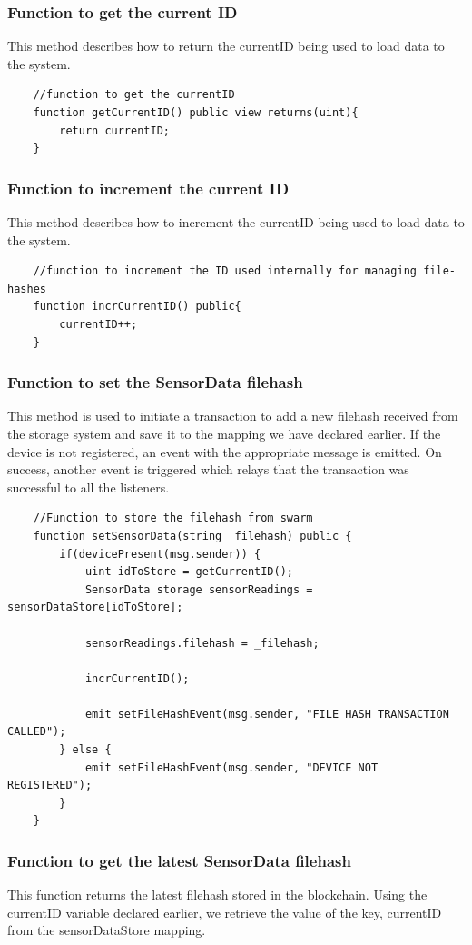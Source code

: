 \documentclass[11pt,openright]{report}
\begin{document}
\subsubsection{Function to get the current ID}
This method describes how to return the currentID being used to load data to the system.
\begin{verbatim}
    //function to get the currentID
    function getCurrentID() public view returns(uint){
        return currentID;
    }
\end{verbatim}
\subsubsection{Function to increment the current ID}
This method describes how to increment the currentID being used to load data to the system.
\begin{verbatim}
    //function to increment the ID used internally for managing file-hashes
    function incrCurrentID() public{
        currentID++;
    }
\end{verbatim}

\subsubsection{Function to set the SensorData filehash}
This method is used to initiate a transaction to add a new filehash received from the storage system and save it to the mapping we have declared earlier. If the device is not registered, an event with the appropriate message is emitted. On success, another event is triggered which relays that the transaction was successful to all the listeners.

\begin{verbatim}
    //Function to store the filehash from swarm
    function setSensorData(string _filehash) public {
        if(devicePresent(msg.sender)) {
            uint idToStore = getCurrentID();
            SensorData storage sensorReadings = sensorDataStore[idToStore];

            sensorReadings.filehash = _filehash;
       
            incrCurrentID();
            
            emit setFileHashEvent(msg.sender, "FILE HASH TRANSACTION CALLED");
        } else {
            emit setFileHashEvent(msg.sender, "DEVICE NOT REGISTERED");
        }
    }
\end{verbatim}

\subsubsection{Function to get the latest SensorData filehash}
This function returns the latest filehash stored in the blockchain. Using the currentID variable declared earlier, we retrieve the value of the key, currentID from the sensorDataStore mapping.
\end{document}
